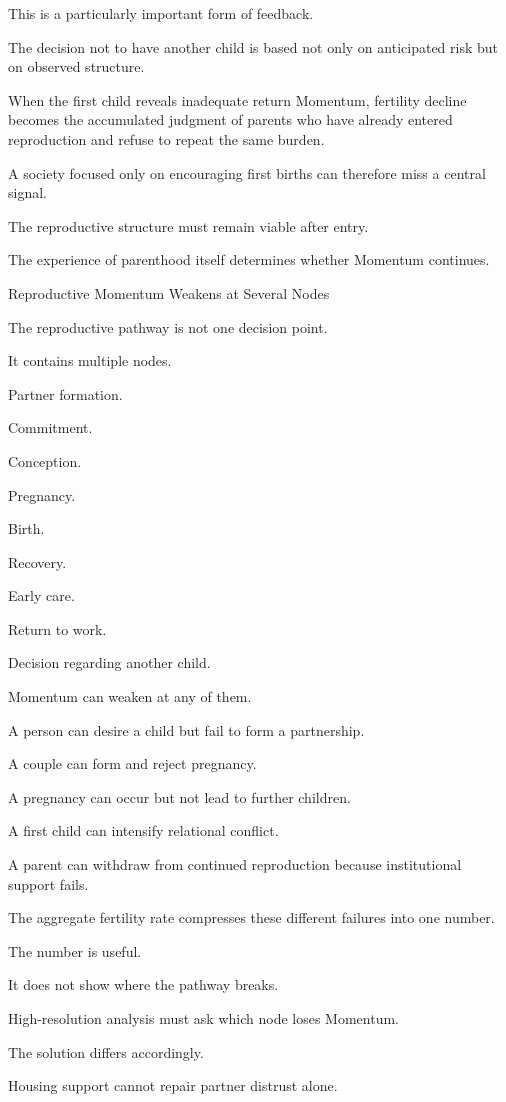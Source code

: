 This is a particularly important form of feedback.

The decision not to have another child is based not only on anticipated risk but on observed structure.

When the first child reveals inadequate return Momentum, fertility decline becomes the accumulated judgment of parents who have already entered reproduction and refuse to repeat the same burden.

A society focused only on encouraging first births can therefore miss a central signal.

The reproductive structure must remain viable after entry.

The experience of parenthood itself determines whether Momentum continues.

Reproductive Momentum Weakens at Several Nodes

The reproductive pathway is not one decision point.

It contains multiple nodes.

Partner formation.

Commitment.

Conception.

Pregnancy.

Birth.

Recovery.

Early care.

Return to work.

Decision regarding another child.

Momentum can weaken at any of them.

A person can desire a child but fail to form a partnership.

A couple can form and reject pregnancy.

A pregnancy can occur but not lead to further children.

A first child can intensify relational conflict.

A parent can withdraw from continued reproduction because institutional support fails.

The aggregate fertility rate compresses these different failures into one number.

The number is useful.

It does not show where the pathway breaks.

High-resolution analysis must ask which node loses Momentum.

The solution differs accordingly.

Housing support cannot repair partner distrust alone.


